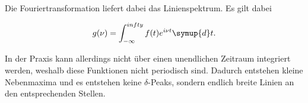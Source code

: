 Die Fouriertransformation liefert dabei das Linienspektrum. Es gilt dabei

\begin{equation}
\label{eqn:fouriertrafo}
    g(\nu) = \int_{-\infty}^{infty} f(t) e^{i\nu t} \symup{d}t.
\end{equation}

In der Praxis kann allerdings nicht über einen unendlichen Zeitraum integriert werden, weshalb diese Funktionen nicht periodisch sind. Dadurch entstehen kleine Nebenmaxima und es entstehen keine $\delta$-Peaks, sondern endlich breite Linien an den entsprechenden Stellen.
